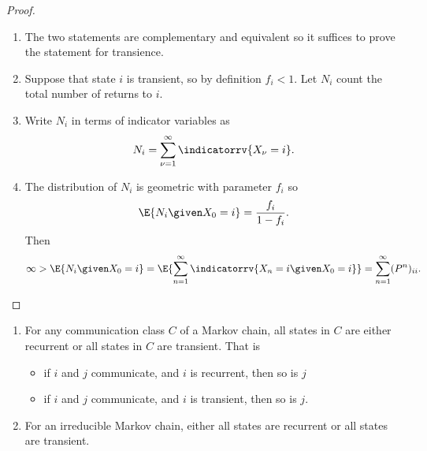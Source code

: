 \documentclass[12pt]{article}
\begin{document}
\begin{proof}
    \begin{enumerate}
        \item
            The two statements are complementary and equivalent so it
            suffices to prove the statement for transience.
        \item
            Suppose that state \( i \) is transient, so by definition \(
            f_i <1 \).  Let \( N_i \) count the total number of returns
            to \( i \).
        \item
            Write \( N_i \) in terms of indicator variables as
            \[
                N_i = \sum\limits_{\nu=1}^{\infty} \indicatorrv{X_\nu=i}.
            \]
        \item
            The distribution of \( N_i \) is geometric with parameter \(
            f_i \) so
            \[
                \E{N_i \given X_0 = i} = \frac{f_i}{1 - f_i}.
            \] Then
            \[
                \infty > \E{N_i \given X_0 = i} = \E{ \sum\limits_{n=1}^
                {\infty} \indicatorrv{X_n=i \given X_0=i}} = \sum\limits_
                {n=1}^{\infty} (P^n)_{ii}.
            \]
    \end{enumerate}
\end{proof}

\begin{corollary}
    \label{cor:stationarydistributions:allrecurrent}
    \begin{enumerate}
        \item
            For any communication class \( C \) of a Markov chain, all
            states in \( C \) are either recurrent or all states in \( C
            \) are transient.  That is
            \begin{itemize}
                \item
                    if \( i \) and \( j \) communicate, and \( i \) is
                    recurrent, then so is \( j \)
                \item
                    if \( i \) and \( j \) communicate, and \( i \) is
                    transient, then so is \( j \).
            \end{itemize}
        \item
            For an irreducible Markov chain, either all states are
            recurrent or all states are transient.
    \end{enumerate}
\end{corollary}
\end{document}
